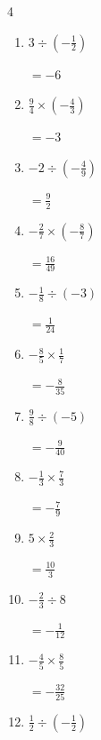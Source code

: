 \begin{multicols}{4}
\begin{enumerate}
        $\displaystyle =-\frac{7}{4}$

  \item $\displaystyle 3\div{}\left(-\frac{1}{2}\right)$

        $\displaystyle =-6$

  \item $\displaystyle \frac{9}{4}\times{}\left(-\frac{4}{3}\right)$

        $\displaystyle =-3$

  \item $\displaystyle -2\div{}\left(-\frac{4}{9}\right)$

        $\displaystyle =\frac{9}{2}$

  \item $\displaystyle -\frac{2}{7}\times{}\left(-\frac{8}{7}\right)$

        $\displaystyle =\frac{16}{49}$

  \item $\displaystyle -\frac{1}{8}\div{}\left(-3\right)$

        $\displaystyle =\frac{1}{24}$

\columnbreak %

\resetques

  \item $\displaystyle -\frac{8}{5}\times{}\frac{1}{7}$

        $\displaystyle =-\frac{8}{35}$

  \item $\displaystyle \frac{9}{8}\div{}\left(-5\right)$

        $\displaystyle =-\frac{9}{40}$

  \item $\displaystyle -\frac{1}{3}\times{}\frac{7}{3}$

        $\displaystyle =-\frac{7}{9}$

  \item $\displaystyle 5\times{}\frac{2}{3}$

        $\displaystyle =\frac{10}{3}$

  \item $\displaystyle -\frac{2}{3}\div{}8$

        $\displaystyle =-\frac{1}{12}$

  \item $\displaystyle -\frac{4}{5}\times{}\frac{8}{5}$

        $\displaystyle =-\frac{32}{25}$

  \item $\displaystyle \frac{1}{2}\div{}\left(-\frac{1}{2}\right)$


\end{enumerate}
\end{multicols}
